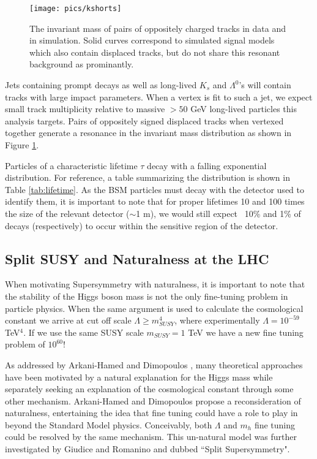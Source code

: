 \begin{figure}
\begin{center}
\texttt{[image: pics/kshorts]}
\caption{The invariant mass of pairs of oppositely charged tracks in data and in simulation. Solid curves correspond to simulated
signal models which also contain displaced tracks, but do not share this resonant background as prominantly. \label{fig:kshorts}}
\end{center}
\end{figure}

Jets containing prompt decays as well as long-lived $K_s$ and $\Lambda^0$'s will contain tracks with large impact parameters. 
When a vertex is fit to such a jet, we expect small track multiplicity relative to 
massive $> 50$ GeV long-lived particles this analysis targets. Pairs of oppositely signed displaced tracks when vertexed together
generate a resonance in the invariant mass distribution as shown in Figure \ref{fig:kshorts}.




Particles of a characteristic lifetime $\tau$ decay with a falling exponential distribution. For reference, 
a table summarizing the distribution is shown in Table
\ref{tab:lifetime}. As the BSM particles must decay with the detector used to identify them, it is important to note  that for proper
lifetimes 10 and 100 times the size of the relevant detector ($\sim$1 m), we would still expect
~10\% and 1\% of decays (respectively) to occur within the sensitive region of the detector.



\subsection{Split SUSY and Naturalness at the LHC}

When motivating Supersymmetry with naturalness, 
it is important to note that the stability of the Higgs boson mass is not the only
 fine-tuning problem in particle physics. When the same argument is used to calculate
 the cosmological constant we arrive at cut off scale
 $\Lambda \geq m_{SUSY}^4$, where experimentally $\Lambda = 10^{-59}$ TeV$^4$.   
If we use the same SUSY scale $m_{SUSY} = 1$ TeV we have a new fine tuning problem of $10^{60}$!

As addressed by Arkani-Hamed and Dimopoulos \cite{nimalhc}, many theoretical approaches  have been
motivated by a natural explanation for the Higgs mass while separately seeking an  explanation
of the cosmological constant through some other mechanism.
Arkani-Hamed and Dimopoulos propose a reconsideration of naturalness, entertaining the idea that 
fine tuning could have a role to play in beyond the Standard Model physics.
Conceivably, both $\Lambda$ and $m_h$ fine tuning could be resolved by the same mechanism.  
This un-natural model was  further investigated by Giudice and Romanino \cite{splitsusy}
and dubbed ``Split Supersymmetry". 


